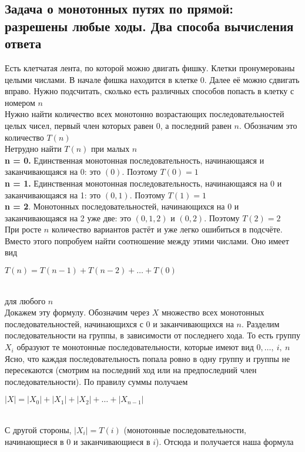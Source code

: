 \documentclass[a4paper]{article}
\begin{document}
\subsection{Задача о монотонных путях по прямой: разрешены любые ходы. Два способа вычисления ответа}
Есть клетчатая лента, по которой можно двигать фишку. Клетки пронумерованы целыми числами. В начале фишка находится в клетке 0. Далее её можно сдвигать вправо. Нужно подсчитать, сколько есть различных способов попасть в клетку с номером $n$\\[2mm]
 Нужно найти количество всех монотонно возрастающих последовательностей целых чисел, первый член которых равен 0, а последний равен $n$. Обозначим это количество $T(n)$\\[2mm]
 Нетрудно найти $T(n)$ при малых $n$\\[2mm]
 \textbf{n = 0.} Единственная монотонная последовательность, начинающаяся и заканчивающаяся на 0: это $(0)$. Поэтому $T (0) = 1$\\[2mm]
 \textbf{n = 1.} Единственная монотонная последовательность, начинающаяся на 0 и заканчивающаяся на 1: это $(0, 1)$. Поэтому $T (1) = 1$\\[2mm]
 \textbf{n = 2}. Монотонных последовательностей, начинающихся на 0 и заканчивающаяся на 2 уже две: это $(0,1,2)$ и $(0,2)$. Поэтому $T(2) = 2$\\[2mm]
 При росте $n$ количество вариантов растёт и уже легко ошибиться в подсчёте.
Вместо этого попробуем найти соотношение между этими числами. Оно имеет вид\\[2mm]
\centerline{$T(n)=T(n-1)+T(n-2)+\ldots+T(0)$}\\[2mm]
для любого $n$\\[2mm]
 Докажем эту формулу. Обозначим через $X$ множество всех монотонных последовательностей, начинающихся с 0 и заканчивающихся на $n$. Разделим последовательности на группы, в зависимости от последнего хода. То есть группу $X_i$ образуют те монотонные последовательности, которые имеют вид $0,\ldots,\ i,\ n$\\[2mm]
 Ясно, что каждая последовательность попала ровно в одну группу и группы не пересекаются (смотрим на последний ход или на предпоследний член последовательности). По правилу суммы получаем\\[2mm]
\centerline{$|X|=|X_0|+|X_1|+|X_2|+\ldots+|X_{n-1}|$}\\[2mm]
\label{sec:2.18}С другой стороны, $|X_i|=T(i)$ (монотонные последовательности, начинающиеся в 0 и заканчивающиеся в $i$). Отсюда и получается наша формула\\[2mm]
\end{document}
